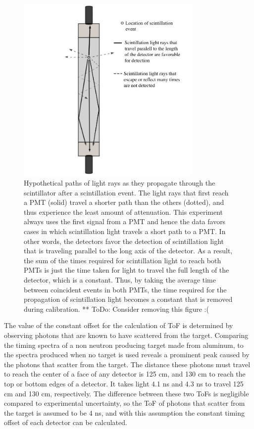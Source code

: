 \begin{figure}
    \centering
    \includegraphics[width = 0.8\textwidth]{Content/Methods/lightpaths.png}
    
    \caption{Hypothetical paths of light rays as they propagate through the scintillator after a scintillation event. The light rays that first reach a PMT (solid) travel a shorter path than the others (dotted), and thus experience the least amount of attenuation. This experiment always uses the first signal from a PMT and hence the data favors cases in which scintillation light travels a short path to a PMT. In other words, the detectors favor the detection of scintillation light that is traveling parallel to the long axis of the detector. As a result, the sum of the times required for scintillation light to reach both PMTs is just the time taken for light to travel the full length of the detector, which is a constant. Thus, by taking the average time between coincident events in both PMTs, the time required for the propagation of scintillation light becomes a constant that is removed during calibration. 
    ** ToDo: Consider removing this figure :( }
    \label{fig:lightpath}
\end{figure}

The value of the constant offset for the calculation of ToF is determined by observing photons that are known to have scattered from the target. Comparing the timing spectra of a non neutron producing target made from aluminum, to the spectra produced when no target is used reveals a prominent peak caused by the photons that scatter from the target. The distance these photons must travel to reach the center of a face of any detector is 125 cm, and 130 cm to reach the top or bottom edges of a detector. It takes light 4.1 ns and 4.3 ns to travel 125 cm and 130 cm, respectively. The difference between these two ToFs is negligible compared to experimental uncertainty, so the ToF of photons that scatter from the target is assumed to be 4 ns, and with this assumption the constant timing offset of each detector can be calculated.  
   
